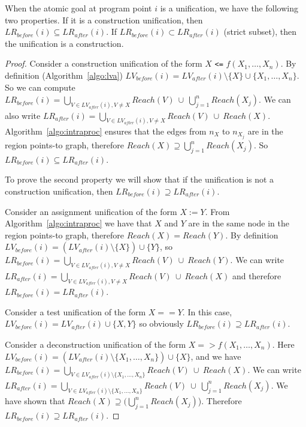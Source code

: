 \documentclass{tlp}
\newcommand{\LVb}[1]{\ensuremath{\mathit{LV}_{\mathit{before}}(#1)}}
\newcommand{\LVa}[1]{\ensuremath{\mathit{LV}_{\mathit{after}}(#1)}}
\newcommand{\LRb}[1]{\ensuremath{\mathit{LR}_{before}(#1)}}
\newcommand{\LRa}[1]{\ensuremath{\mathit{LR}_{after}(#1)}}
\newcommand{\Reach}[1]{\ensuremath{{Reach}(#1)}}
\newcommand{\code}[1]{{\tt#1}}
\begin{document}
\begin{proposition}
\label{propo:two}
    When the atomic goal at program point $i$ is a unification,
    we have the following two properties.
    If it is a construction unification, then $\LRb{i} \subseteq \LRa{i}$.
    If $\LRb{i} \subset \LRa{i}$ (strict subset),
    then the unification is a construction.
\end{proposition}
\begin{proof}
    Consider a construction unification
    of the form $X$ \code{<=} $f(X_1, \dots, X_n)$.
    By definition (Algorithm~\ref{algo:lva})
    $\LVb{i} = \LVa{i} \setminus \{X\} \cup \{X_1, \dots, X_n\}$.
    So we can compute $\LRb{i} =
    \bigcup_{{  V \in \LVa{i}, V \not= X}}    \Reach{V} ~ \cup~
    \bigcup_{j=1}^{n} \Reach{X_j}$.
     We can also write $\LRa{i} =
    \bigcup_{{  V \in \LVa{i}, V \not= X}} \Reach{V} ~ \cup ~
    \Reach{X}$.
    Algorithm~\ref{algo:intraproc} ensures that
    the edges from $n_X$ to $n_{X_j}$ are in the region points-to graph,
    therefore
    $\Reach{X} \supseteq \bigcup_{j=1}^{n}  \Reach{X_j}$.
    So $\LRb{i} \subseteq \LRa{i}$.

    To prove the second property we will show that
    if the unification is not a construction unification,
    then $\LRb{i} \supseteq \LRa{i}$.

    Consider an assignment unification of the form $X := Y$.
    From Algorithm~\ref{algo:intraproc} we have that
    $X$ and $Y$ are in the same node in the region points-to graph,
    therefore $\mathit{Reach}(X) = \mathit{Reach}(Y)$.
    By definition $\LVb{i} = (\LVa{i} \setminus \{X\}) \cup \{Y\}$, so
    $\LRb{i} = \bigcup_{{  V \in \LVa{i}, V \not= X}} \Reach{V}
   ~ \cup ~ \Reach{Y}$.
    We can write
    $\LRa{i} = \bigcup_{ V \in \LVa{i},V \not= X} \Reach{V}
    ~ \cup ~ \Reach{X}$
    and therefore $\LRb{i} = \LRa{i}$.

    Consider a test unification of the form $X == Y$.
    In this case, $\LVb{i} = \LVa{i} \cup \{X, Y\}$
    so obviously $\LRb{i} \supseteq \LRa{i}$.

    Consider a deconstruction unification of the form
    $X = > f(X_1, \dots, X_n)$.
    Here $\LVb{i} = (\LVa{i} \setminus \{X_1,\dots, X_n\}) \cup \{X\}$,
    and we have $\LRb{i} =
    \bigcup_{ V \in \LVa{i} \setminus \{X_1,\dots,X_n\}} \Reach{V}
    ~ \cup  ~ \Reach{X}$.
    We can write $\LRa{i} =
    \bigcup_{V \in \LVa{i} \setminus \{X_1,\dots,X_n\}} \Reach{V}
    ~ \cup ~ \bigcup_{j=1}^n \Reach{X_j}$.
    We have shown that
    $\mathit{Reach}(X) \supseteq (\bigcup_{j=1}^n \Reach{X_j}$).
    Therefore $\LRb{i} \supseteq \LRa{i}$.
\end{proof}
\end{document}
